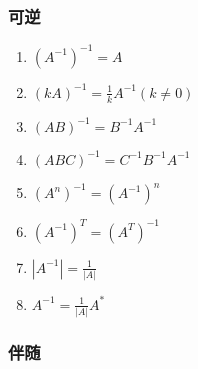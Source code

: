 \documentclass[a4paper,12pt]{article}
\begin{document}
    \subsubsection{可逆}

    \begin{enumerate}
        \item $(A^{-1})^{-1} = A$
        \item $(kA)^{-1} = \frac{1}{k}A^{-1}(k \neq 0)$
        \item $(AB)^{-1} = B^{-1}A^{-1}$
        \item $(ABC)^{-1} = C^{-1}B^{-1}A^{-1}$
        \item $(A^n)^{-1} = (A^{-1})^n$
        \item $(A^{-1})^T = (A^T)^{-1}$
        \item $|A^{-1}| = \frac{1}{|A|}$
        \item $A^{-1} = \frac{1}{|A|}A^{*}$
    \end{enumerate}

    \subsubsection{伴随}
\end{document}
